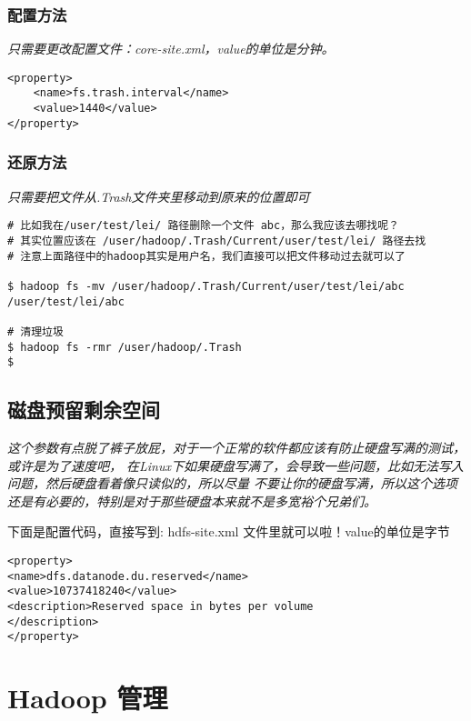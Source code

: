 \documentclass{article}
\begin{document}
\subsubsection{配置方法}
\textit{
只需要更改配置文件：core-site.xml，value的单位是分钟。
}

\begin{verbatim}
<property>
	<name>fs.trash.interval</name>
	<value>1440</value>
</property>
\end{verbatim}

\subsubsection{还原方法}
\textit{
只需要把文件从.Trash文件夹里移动到原来的位置即可
}

\begin{verbatim}
# 比如我在/user/test/lei/ 路径删除一个文件 abc，那么我应该去哪找呢？
# 其实位置应该在 /user/hadoop/.Trash/Current/user/test/lei/ 路径去找
# 注意上面路径中的hadoop其实是用户名，我们直接可以把文件移动过去就可以了

$ hadoop fs -mv /user/hadoop/.Trash/Current/user/test/lei/abc /user/test/lei/abc

# 清理垃圾
$ hadoop fs -rmr /user/hadoop/.Trash
$
\end{verbatim}

\subsection{磁盘预留剩余空间}
\textit{
这个参数有点脱了裤子放屁，对于一个正常的软件都应该有防止硬盘写满的测试，或许是为了速度吧，
在Linux下如果硬盘写满了，会导致一些问题，比如无法写入问题，然后硬盘看着像只读似的，所以尽量
不要让你的硬盘写满，所以这个选项还是有必要的，特别是对于那些硬盘本来就不是多宽裕个兄弟们。
}

下面是配置代码，直接写到: hdfs-site.xml 文件里就可以啦！value的单位是字节

\begin{verbatim}
<property> 
<name>dfs.datanode.du.reserved</name> 
<value>10737418240</value> 
<description>Reserved space in bytes per volume
</description> 
</property>
\end{verbatim}


\section{Hadoop 管理}
\end{document}
